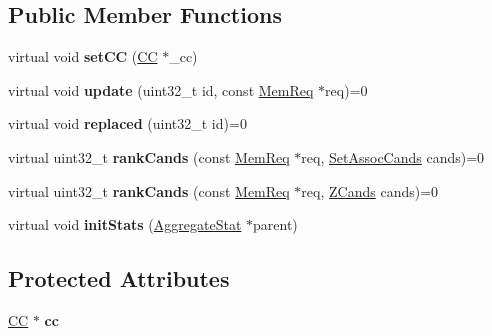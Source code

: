 \subsection*{Public Member Functions}
\begin{DoxyCompactItemize}
\item 
\hypertarget{classReplPolicy_a3e4b6f77f73a08be162d72414dab8b02}{virtual void {\bfseries set\-C\-C} (\hyperlink{classCC}{C\-C} $\ast$\-\_\-cc)}\label{classReplPolicy_a3e4b6f77f73a08be162d72414dab8b02}

\item 
\hypertarget{classReplPolicy_a177f7fdd8a2beb82611cfa56390c1b77}{virtual void {\bfseries update} (uint32\-\_\-t id, const \hyperlink{structMemReq}{Mem\-Req} $\ast$req)=0}\label{classReplPolicy_a177f7fdd8a2beb82611cfa56390c1b77}

\item 
\hypertarget{classReplPolicy_a52cd8ad55c43817d5f48e819f47ddc7a}{virtual void {\bfseries replaced} (uint32\-\_\-t id)=0}\label{classReplPolicy_a52cd8ad55c43817d5f48e819f47ddc7a}

\item 
\hypertarget{classReplPolicy_af630792de319f21796dd4348d69611e2}{virtual uint32\-\_\-t {\bfseries rank\-Cands} (const \hyperlink{structMemReq}{Mem\-Req} $\ast$req, \hyperlink{structSetAssocCands}{Set\-Assoc\-Cands} cands)=0}\label{classReplPolicy_af630792de319f21796dd4348d69611e2}

\item 
\hypertarget{classReplPolicy_a7ddfe77082cf23c6d7fdc8dae67ab8c0}{virtual uint32\-\_\-t {\bfseries rank\-Cands} (const \hyperlink{structMemReq}{Mem\-Req} $\ast$req, \hyperlink{structZCands}{Z\-Cands} cands)=0}\label{classReplPolicy_a7ddfe77082cf23c6d7fdc8dae67ab8c0}

\item 
\hypertarget{classReplPolicy_a4a7eff9648fcd8ce037fa16da5752810}{virtual void {\bfseries init\-Stats} (\hyperlink{classAggregateStat}{Aggregate\-Stat} $\ast$parent)}\label{classReplPolicy_a4a7eff9648fcd8ce037fa16da5752810}

\end{DoxyCompactItemize}
\subsection*{Protected Attributes}
\begin{DoxyCompactItemize}
\item 
\hypertarget{classReplPolicy_a7fc5a277bfde3785b47ca2b1732b03fb}{\hyperlink{classCC}{C\-C} $\ast$ {\bfseries cc}}\label{classReplPolicy_a7fc5a277bfde3785b47ca2b1732b03fb}

\end{DoxyCompactItemize}


